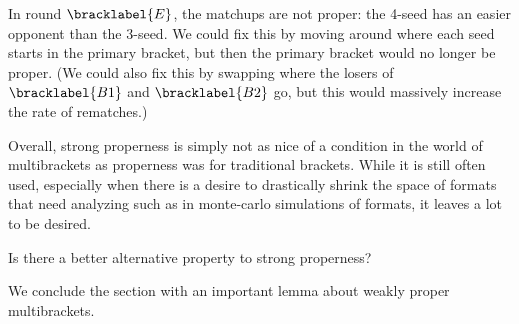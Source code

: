 {    In round $\bracklabel{E}$, the matchups are not proper: the 4-seed has an easier opponent than the 3-seed. We could fix this by moving around where each seed starts in the primary bracket, but then the primary bracket would no longer be proper. (We could also fix this by swapping where the losers of $\bracklabel{B1}$ and $\bracklabel{B2}$ go, but this would massively increase the rate of rematches.)

    Overall, strong properness is simply not as nice of a condition in the world of multibrackets as properness was for traditional brackets. While it is still often used, especially when there is a desire to drastically shrink the space of formats that need analyzing such as in monte-carlo simulations of formats, it leaves a lot to be desired.

    \begin{oq}{}{}
        Is there a better alternative property to strong properness?
    \end{oq}

    We conclude the section with an important lemma about weakly proper multibrackets.


}
